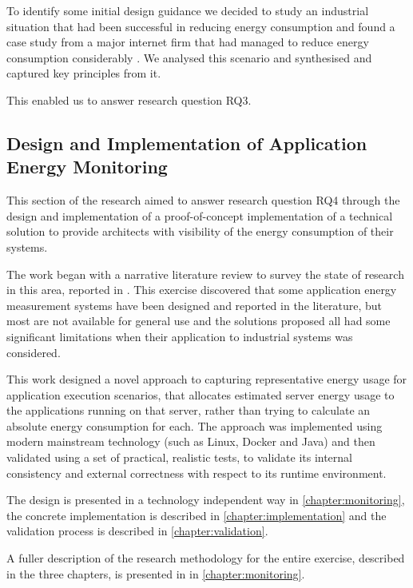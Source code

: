 To identify some initial design guidance we decided to study an industrial situation that had been successful in reducing energy consumption and found a case study from a major internet firm that had managed to reduce energy consumption considerably \cite{ebay2013-digitalefficiency}.  We analysed this scenario and synthesised and captured key principles from it.

This enabled us to answer research question RQ3.

\subsection{Design and Implementation of Application Energy Monitoring}

This section of the research aimed to answer research question RQ4 through the design and implementation of a proof-of-concept implementation of a technical solution to provide architects with visibility of the energy consumption of their systems.

The work began with a narrative literature review to survey the state of research in this area, reported in .  This exercise discovered that some application energy measurement systems have been designed and reported in the literature, but most are not available for general use and the solutions proposed all had some significant limitations when their application to industrial systems was considered.



This work designed a novel approach to capturing representative energy usage for application execution scenarios, that allocates estimated server energy usage to the applications running on that server, rather than trying to calculate an absolute energy consumption for each.  The approach was implemented using modern mainstream technology (such as Linux, Docker and Java) and then validated using a set of practical, realistic tests, to validate its internal consistency and external correctness with respect to its runtime environment.

The design is presented in a technology independent way in \cref{chapter:monitoring}, the concrete implementation is described in \cref{chapter:implementation} and the validation process is described in \cref{chapter:validation}.

A fuller description of the research methodology for the entire exercise, described in the three chapters, is presented in  in \cref{chapter:monitoring}.

